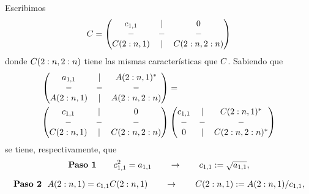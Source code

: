 \begin{tcolorbox}
Escribimos
$$
\Cb=
\begin{pmatrix}
 c_{1,1}&|&\cero \\
 -&-&-\\
 \Cb(2:n,1)&|&\Cb(2:n,2:n)
\end{pmatrix}
$$
donde $\Cb(2:n,2:n)$ tiene las mismas características que $\Cb$. Sabiendo que
\begin{eqnarray}
\label{eq:desc_de_A_:w
Chol}
\begin{pmatrix}
 a_{1,1}&|&\Ab(2:n,1)^* \\
 -&-&-\\
 \Ab(2:n,1)&|&\Ab(2:n,2:n)
\end{pmatrix}&= \\ \nonumber
\begin{pmatrix}
 c_{1,1}&|&\cero \\
 -&-&-\\
 \Cb(2:n,1)&|&\Cb(2:n,2:n)
\end{pmatrix}
&
\begin{pmatrix}
 c_{1,1}&|&\Cb(2:n,1)^* \\
 -&-&-\\
 \cero&|&\Cb(2:n,2:n)^*
\end{pmatrix}
\end{eqnarray}
se tiene, respectivamente, que
$$
\mbox{\bf Paso 1}  \qquad c_{1,1}^2=a_{1,1} \qquad \to \qquad c_{1,1}:=\sqrt{a_{1,1}},
$$

$$
\mbox{\bf Paso 2} \ \  \Ab(2:n,1)=c_{1,1}\Cb(2:n,1)\qquad\to\qquad \Cb(2:n,1):=\Ab(2:n,1)/c_{1,1},
$$


\end{tcolorbox}
